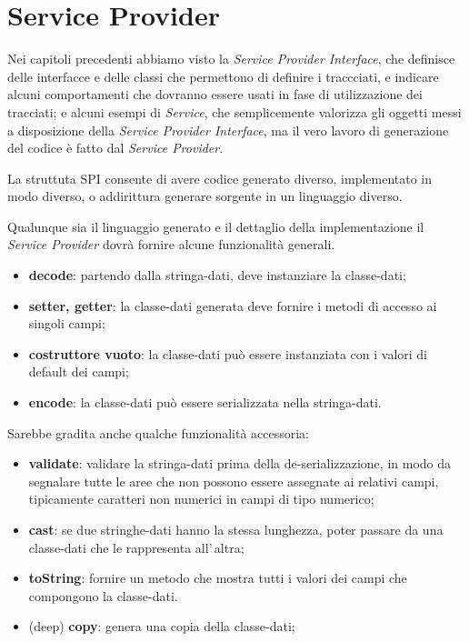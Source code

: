 \documentclass[a4paper,10pt]{report}
\begin{document}
\chapter{Service Provider}
Nei capitoli precedenti abbiamo visto la \textsl{Service Provider Interface}, 
che  definisce delle interfacce e delle classi che permettono di definire i 
traccciati, e indicare alcuni comportamenti che dovranno essere usati in fase di
utilizzazione dei tracciati; e alcuni esempi di \textsl{Service}, che
semplicemente valorizza gli oggetti messi a disposizione della 
\textsl{Service Provider Interface}, ma il vero lavoro di generazione del codice 
è fatto dal \textsl{Service Provider}.

La struttuta SPI consente di avere codice generato diverso, implementato in modo
diverso, o addirittura generare sorgente in un linguaggio diverso.

Qualunque sia il linguaggio generato e il dettaglio della implementazione il
\textsl{Service Provider} dovrà fornire alcune funzionalità generali.

\begin{itemize}
\item \textbf{decode}: partendo dalla stringa-dati, deve instanziare la 
    classe-dati;
\item \textbf{setter, getter}: la classe-dati generata deve fornire i metodi di 
    accesso ai singoli campi;
\item \textbf{costruttore vuoto}: la classe-dati può essere instanziata con i 
    valori di default dei campi;
\item \textbf{encode}: la classe-dati può essere serializzata nella 
    stringa-dati.
\end{itemize}
Sarebbe gradita anche qualche funzionalità accessoria:
\begin{itemize}
\item \textbf{validate}: validare la stringa-dati prima della 
    de-serializzazione, in modo da segnalare tutte le aree che non possono essere
    assegnate ai relativi campi, tipicamente caratteri non numerici in campi di
    tipo numerico;
\item \textbf{cast}: se due stringhe-dati hanno la stessa lunghezza, poter 
    passare da una classe-dati che le rappresenta all'\,altra;
\item \textbf{toString}: fornire un metodo che mostra tutti i valori dei campi 
    che compongono la classe-dati.
\item (deep) \textbf{copy}: genera una copia della classe-dati;
\end{itemize}
\end{document}
